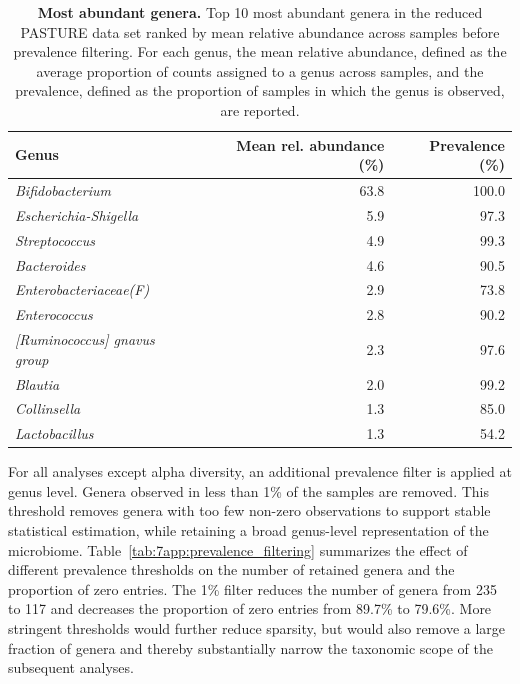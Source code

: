 \begin{table}[!ht]
\centering
\caption{\textbf{Most abundant genera.} Top 10 most abundant genera in the reduced PASTURE data set ranked by mean relative abundance across samples before prevalence filtering. For each genus, the mean relative abundance, defined as the average proportion of counts assigned to a genus across samples, and the prevalence, defined as the proportion of samples in which the genus is observed, are reported.}
\label{tab:7app:top_genera}
\vspace{0.5em}
\begin{tabular}{lrr}
\toprule
Genus & Mean rel. abundance (\%) & Prevalence (\%) \\
\midrule
\emph{Bifidobacterium} & 63.8 & 100.0 \\
\emph{Escherichia-Shigella} & 5.9 & 97.3 \\
\emph{Streptococcus} & 4.9 & 99.3 \\
\emph{Bacteroides} & 4.6 & 90.5 \\
\emph{Enterobacteriaceae(F)} & 2.9 & 73.8 \\
\emph{Enterococcus} & 2.8 & 90.2 \\
\emph{[Ruminococcus] gnavus group} & 2.3 & 97.6 \\
\emph{Blautia} & 2.0 & 99.2 \\
\emph{Collinsella} & 1.3 & 85.0 \\
\emph{Lactobacillus} & 1.3 & 54.2 \\
\bottomrule
\end{tabular}
\end{table}

For all analyses except alpha diversity, an additional prevalence filter is applied at genus level. Genera observed in less than 1\% of the samples are removed. This threshold removes genera with too few non-zero observations to support stable statistical estimation, while retaining a broad genus-level representation of the microbiome. Table~\ref{tab:7app:prevalence_filtering} summarizes the effect of different prevalence thresholds on the number of retained genera and the proportion of zero entries. The 1\% filter reduces the number of genera from 235 to 117 and decreases the proportion of zero entries from 89.7\% to 79.6\%. More stringent thresholds would further reduce sparsity, but would also remove a large fraction of genera and thereby substantially narrow the taxonomic scope of the subsequent analyses.

